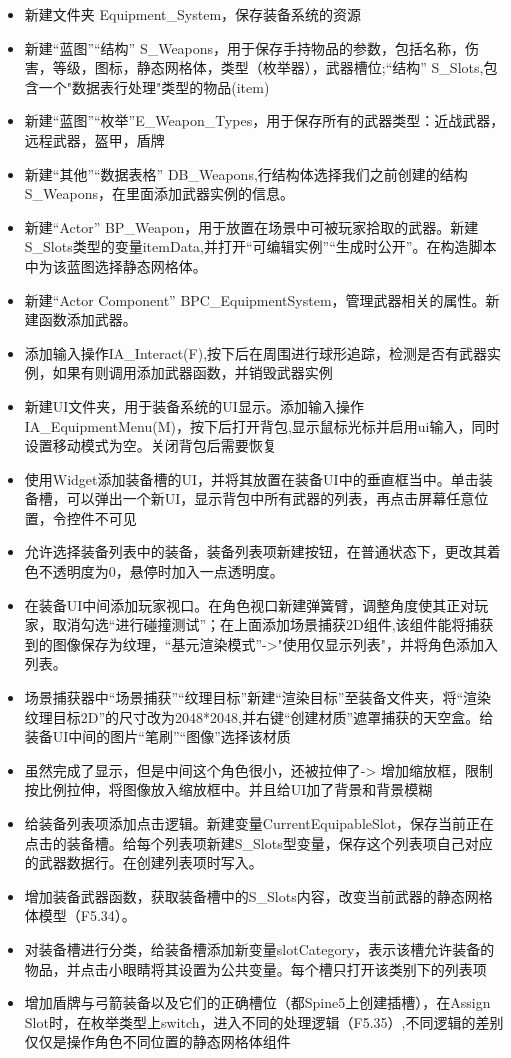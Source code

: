 \documentclass[11pt,oneside]{book}
\begin{document}
\begin{itemize}
    \item 新建文件夹 Equipment\_System，保存装备系统的资源
    \item 新建“蓝图”“结构” S\_Weapons，用于保存手持物品的参数，包括名称，伤害，等级，图标，静态网格体，类型（枚举器），武器槽位;“结构” S\_Slots,包含一个"数据表行处理"类型的物品(item)
    \item 新建“蓝图”“枚举”E\_Weapon\_Types，用于保存所有的武器类型：近战武器，远程武器，盔甲，盾牌
    \item 新建“其他”“数据表格” DB\_Weapons,行结构体选择我们之前创建的结构S\_Weapons，在里面添加武器实例的信息。
    \item 新建“Actor” BP\_Weapon，用于放置在场景中可被玩家拾取的武器。新建S\_Slots类型的变量itemData,并打开“可编辑实例”“生成时公开”。在构造脚本中为该蓝图选择静态网格体。
    \item 新建“Actor Component” BPC\_EquipmentSystem，管理武器相关的属性。新建函数添加武器。
    \item 添加输入操作IA\_Interact(F),按下后在周围进行球形追踪，检测是否有武器实例，如果有则调用添加武器函数，并销毁武器实例
    \item 新建UI文件夹，用于装备系统的UI显示。添加输入操作IA\_EquipmentMenu(M)，按下后打开背包,显示鼠标光标并启用ui输入，同时设置移动模式为空。关闭背包后需要恢复
    \item 使用Widget添加装备槽的UI，并将其放置在装备UI中的垂直框当中。单击装备槽，可以弹出一个新UI，显示背包中所有武器的列表，再点击屏幕任意位置，令控件不可见
    \item 允许选择装备列表中的装备，装备列表项新建按钮，在普通状态下，更改其着色不透明度为0，悬停时加入一点透明度。
    
    \item 在装备UI中间添加玩家视口。在角色视口新建弹簧臂，调整角度使其正对玩家，取消勾选“进行碰撞测试”；在上面添加场景捕获2D组件,该组件能将捕获到的图像保存为纹理，“基元渲染模式”->"使用仅显示列表"，并将角色添加入列表。
    \item 场景捕获器中“场景捕获”“纹理目标”新建“渲染目标”至装备文件夹，将“渲染纹理目标2D”的尺寸改为2048*2048,并右键“创建材质”遮罩捕获的天空盒。给装备UI中间的图片“笔刷”“图像”选择该材质
    \item 虽然完成了显示，但是中间这个角色很小，还被拉伸了-> 增加缩放框，限制按比例拉伸，将图像放入缩放框中。并且给UI加了背景和背景模糊
    \item 给装备列表项添加点击逻辑。新建变量CurrentEquipableSlot，保存当前正在点击的装备槽。给每个列表项新建S\_Slots型变量，保存这个列表项自己对应的武器数据行。在创建列表项时写入。
    
    \item 增加装备武器函数，获取装备槽中的S\_Slots内容，改变当前武器的静态网格体模型（F5.34）。
    \item 对装备槽进行分类，给装备槽添加新变量slotCategory，表示该槽允许装备的物品，并点击小眼睛将其设置为公共变量。每个槽只打开该类别下的列表项
    \item 增加盾牌与弓箭装备以及它们的正确槽位（都Spine5上创建插槽），在Assign Slot时，在枚举类型上switch，进入不同的处理逻辑（F5.35）,不同逻辑的差别仅仅是操作角色不同位置的静态网格体组件

\end{itemize}
\end{document}
